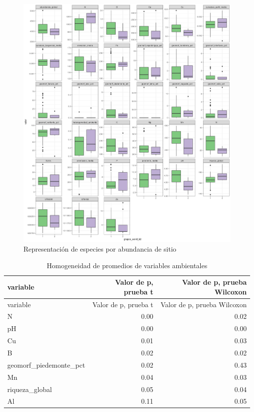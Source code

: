 \documentclass[11pt,]{article}
\begin{document}
\begin{figure}
\centering
\includegraphics[width=1.00000\textwidth]{Rplot01_diagrama_caja_agrpados.png}
\caption{Representación de especies por abundancia de
sitio\label{homogeneidades}}
\end{figure}

\begin{longtable}[]{@{}lrr@{}}
\caption{Homogeneidad de promedios de variables
ambientales\label{promedio}}\tabularnewline
\toprule
variable & Valor de p, prueba t & Valor de p, prueba
Wilcoxon\tabularnewline
\midrule
\endfirsthead
\toprule
variable & Valor de p, prueba t & Valor de p, prueba
Wilcoxon\tabularnewline
\midrule
\endhead
N & 0.00 & 0.02\tabularnewline
pH & 0.00 & 0.00\tabularnewline
Cu & 0.01 & 0.03\tabularnewline
B & 0.02 & 0.02\tabularnewline
geomorf\_piedemonte\_pct & 0.02 & 0.43\tabularnewline
Mn & 0.04 & 0.03\tabularnewline
riqueza\_global & 0.05 & 0.04\tabularnewline
Al & 0.11 & 0.05\tabularnewline
\bottomrule
\end{longtable}
\end{document}
